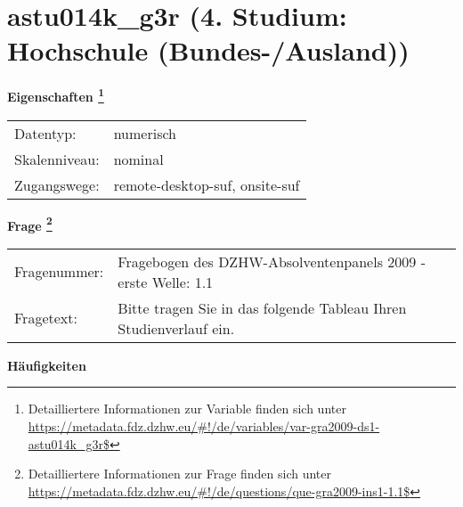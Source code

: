 
    \setcounter{footnote}{0}

    \vspace*{-1.8cm}
	\section{astu014k\_g3r (4. Studium: Hochschule (Bundes-/Ausland))}
	\label{section:astu014k_g3r}



    \vspace*{0.5cm}
    \noindent\textbf{Eigenschaften
	\footnote{Detailliertere Informationen zur Variable finden sich unter
		\url{https://metadata.fdz.dzhw.eu/\#!/de/variables/var-gra2009-ds1-astu014k_g3r$}}}\\
	\begin{tabularx}{\hsize}{@{}lX}
	Datentyp: & numerisch \\
	Skalenniveau: & nominal \\
	Zugangswege: &
	  remote-desktop-suf, 
	  onsite-suf
 \\
    \end{tabularx}



				\vspace*{0.5cm}
                \noindent\textbf{Frage
	                \footnote{Detailliertere Informationen zur Frage finden sich unter
		              \url{https://metadata.fdz.dzhw.eu/\#!/de/questions/que-gra2009-ins1-1.1$}}}\\
				\begin{tabularx}{\hsize}{@{}lX}
					Fragenummer: &
					  Fragebogen des DZHW-Absolventenpanels 2009 - erste Welle:
					  1.1
 \\
					Fragetext: & Bitte tragen Sie in das folgende Tableau Ihren Studienverlauf ein. \\
				\end{tabularx}





        		\vspace*{0.5cm}
                \noindent\textbf{Häufigkeiten}

